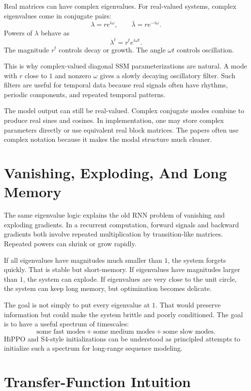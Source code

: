 Real matrices can have complex eigenvalues. For real-valued systems, complex eigenvalues
come in conjugate pairs:
\[
  \lambda = r e^{i\omega},
  \qquad
  \bar{\lambda} = r e^{-i\omega}.
\]
Powers of $\lambda$ behave as
\[
  \lambda^t = r^t e^{i\omega t}.
\]
The magnitude $r^t$ controls decay or growth. The angle $\omega t$ controls oscillation.

This is why complex-valued diagonal SSM parameterizations are natural. A mode with
$r$ close to $1$ and nonzero $\omega$ gives a slowly decaying oscillatory filter. Such
filters are useful for temporal data because real signals often have rhythms, periodic
components, and repeated temporal patterns.

The model output can still be real-valued. Complex conjugate modes combine to produce real
sines and cosines. In implementation, one may store complex parameters directly or use
equivalent real block matrices. The papers often use complex notation because it makes
the modal structure much cleaner.

\section{Vanishing, Exploding, And Long Memory}

The same eigenvalue logic explains the old RNN problem of vanishing and exploding
gradients. In a recurrent computation, forward signals and backward gradients both involve
repeated multiplication by transition-like matrices. Repeated powers can shrink or grow
rapidly.

If all eigenvalues have magnitudes much smaller than $1$, the system forgets quickly.
That is stable but short-memory. If eigenvalues have magnitudes larger than $1$, the
system can explode. If eigenvalues are very close to the unit circle, the system can keep
long memory, but optimization becomes delicate.

The goal is not simply to put every eigenvalue at $1$. That would preserve information
but could make the system brittle and poorly conditioned. The goal is to have a useful
spectrum of timescales:
\[
  \text{some fast modes} + \text{some medium modes} + \text{some slow modes}.
\]
HiPPO and S4-style initializations can be understood as principled attempts to initialize
such a spectrum for long-range sequence modeling.

\section{Transfer-Function Intuition}

